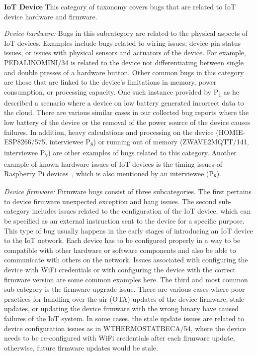 \textbf{IoT Device}
This category of taxonomy covers bugs that are related to IoT device hardware and firmware.

\textit{Device hardware:}
Bugs in this subcategory are related to the physical aspects of IoT devices.  Examples include bugs related to
 wiring issues, device pin status issues, or issues with physical sensors and actuators of the device. For example, PEDALINOMINI/34 is related to the device not differentiating between single and double presses of a hardware button. Other common bugs in this category are those that are linked to the device's limitations in memory, power consumption, or processing capacity. One such instance provided by P\textsubscript{1} as he described a scenario where a device on low battery generated incorrect data to the cloud. There are various similar cases in our collected bug reports where the low battery of the device or the removal of the power source of the device causes failures. In addition, heavy calculations and processing on the device (HOMIE-ESP8266/575, interviewee P\textsubscript{8}) or running out of memory (ZWAVE2MQTT/141, interviewee P\textsubscript{7}) are other examples of bugs related to this category. Another example of known hardware issues of IoT devices is the timing issues of Raspberry Pi devices~\cite{piClockissues},  which is also mentioned by an interviewee (P\textsubscript{8}).

\textit{Device firmware:} 
Firmware bugs consist of three subcategories. The first pertains to device firmware unexpected exception and hang issues. The second sub-category includes issues related to the configuration of the IoT device, which can be specified as an external instruction sent to the device for a specific purpose. This type of bug usually happens in the early stages of introducing an IoT device to the IoT network. Each device has to be configured properly in a way to be compatible with other hardware or software components and also be able to communicate with others on the network. Issues associated with configuring the device with WiFi credentials or with configuring the device with the correct firmware version are some common examples here. The third and most common sub-category is the firmware upgrade issue. There are various cases where poor practices for handling over-the-air (OTA) updates of the device firmware, stale updates, or updating the device firmware with the wrong binary have caused failures of the IoT system.
In some cases, the stale update issues are related to device configuration issues as in WTHERMOSTATBECA/54, where the device needs to be re-configured with WiFi credentials after each firmware update, otherwise, future firmware updates would be stale. 

